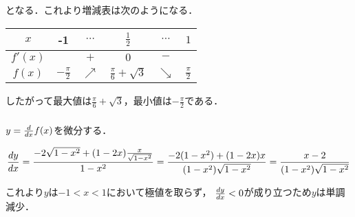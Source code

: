 となる．これより増減表は次のようになる．

\begin{center}
  \begin{tabular}{|c||ccccc|}
    \hline
    $x$ & -1 & $\cdots$ & $\frac{1}{2}$ & $\cdots$ & $1$ \\
    \hline
    $f'(x)$ &  & $+$ & $0$ & $-$ & \\
    \hline
    $f(x)$ & $-\frac{\pi}{2}$ & $\nearrow$ & $\frac{\pi}{6} + \sqrt{3}$ & $\searrow$ & $\frac{\pi}{2}$ \\
    \hline
  \end{tabular}
\end{center}

したがって最大値は$\frac{\pi}{6} + \sqrt{3}$，最小値は$-\frac{\pi}{2}$である．


\subsubsection{}

$y=\dv{x}f(x)$を微分する．

\begin{gather*}
  \dv{y}{x} = \frac{-2\sqrt{1-x^2}+\lparen 1-2x \rparen \frac{x}{\sqrt{1-x^2}}}{1-x^2}
  = \frac{-2 \lparen 1-x^2 \rparen + \lparen 1-2x \rparen x}{\lparen 1-x^2 \rparen \sqrt{1-x^2}}
  = \frac{x - 2}{\lparen 1-x^2 \rparen \sqrt{1-x^2}}
\end{gather*}

これより$y$は$-1 < x < 1$において極値を取らず，
$\dv{y}{x} < 0$が成り立つため$y$は単調減少．


\subsubsection{}



\subsection{}

\subsubsection{}

